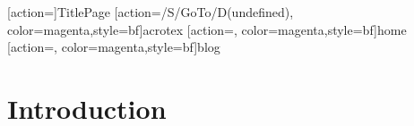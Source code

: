 \documentclass{article}
\begin{document}
\maketitle

[action={}]{TitlePage}
[action={/S/GoTo/D(undefined)},%
  color=magenta,style={bf}]{acrotex}
[action={},%
  color=magenta,style={bf}]{home}
[action={},%
  color=magenta,style={bf}]{blog}



\tableofcontents
{}

\section{Introduction}\label{intro}
\end{document}
